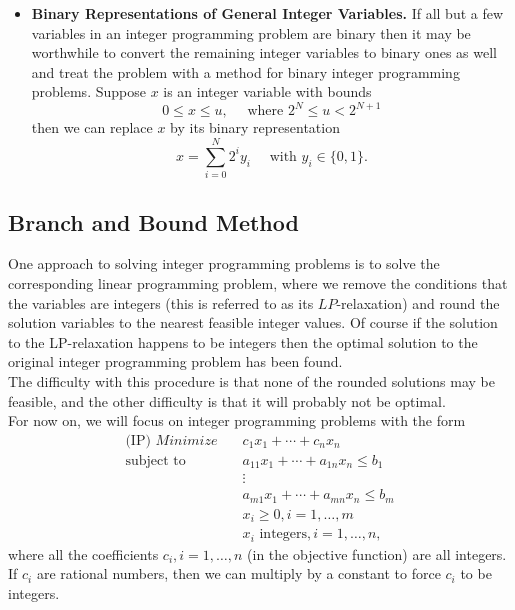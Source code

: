 \begin{itemize}
\begin{align*}
              \sum_{i = 1}^k y_i             & = 1                           \\
              y_i \text{ binary } \quad      & \quad i = 1, 2 \dots, k
          \end{align*}
    \item \textbf{Binary Representations of General Integer Variables.} If all but a few variables in an integer programming problem are binary then it may be worthwhile to convert the remaining integer variables to binary ones as well and treat the problem with a method for binary integer programming problems. Suppose \(x\) is an integer variable with bounds
          \[0 \leq x \leq u, \quad\text{ where } 2^N \leq u < 2^{N + 1}\]
          then we can replace \(x\) by its binary representation
          \[x = \sum_{i = 0}^N 2^i y_i \quad \text{ with } y_i \in \{0, 1\}.\]
\end{itemize}

\subsection{Branch and Bound Method}
One approach to solving integer programming problems is to solve the corresponding linear programming problem, where we remove the conditions that the variables are integers (this is referred to as its \(LP\)-relaxation) and round the solution variables to the nearest feasible integer values. Of course if the solution to the LP-relaxation happens to be integers then the optimal solution to the original integer programming problem has been found. \\

The difficulty with this procedure is that none of the rounded solutions may be feasible, and the other difficulty is that it will probably not be optimal. \\

For now on, we will focus on integer programming problems with the form
\begin{align*}
    \text{(IP) } Minimize \quad & c_1x_1 + \cdots + c_nx_n                \\
    \text{subject to } \quad    & a_{11}x_1 + \cdots + a_{1n}x_n \leq b_1 \\
                                & \vdots                                  \\
                                & a_{m1}x_1 + \cdots + a_{mn}x_n \leq b_m \\
                                & x_i \geq 0, i = 1, \dots, m             \\
                                & x_i \text{ integers}, i = 1, \dots, n,
\end{align*}
where all the coefficients \(c_i, i = 1,\dots, n\) (in the objective function) are all integers. If \(c_i\) are rational numbers, then we can multiply by a constant to force \(c_i\) to be integers. \\

